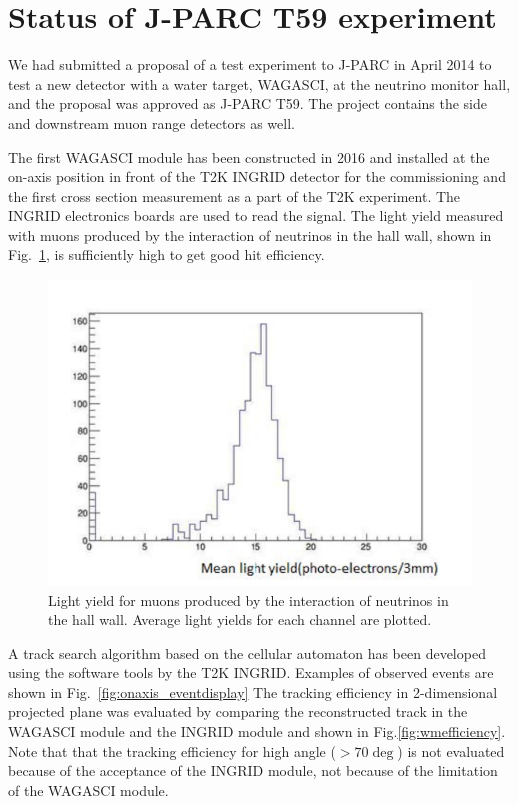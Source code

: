 \section{Status of J-PARC T59 experiment}
We had submitted a proposal of a test experiment to J-PARC in April 2014 to test a new detector with a water target, WAGASCI, at the neutrino monitor hall, and the proposal was approved as J-PARC T59.
The project contains the side and downstream muon range detectors as well.

The first WAGASCI module has been constructed in 2016 and installed at the on-axis position in front of the T2K INGRID detector for the commissioning and the first cross section measurement as a part of the T2K experiment.
The INGRID electronics boards are used to read the signal.
The light yield measured with muons produced by the interaction of neutrinos
in the hall wall, shown in Fig.~\ref{fig:wmlight}, is sufficiently high to get good hit efficiency.  
%
\begin{figure}[tbh]
\begin{center}
\includegraphics[width=0.5\linewidth]{fig/wmlight.pdf}
\end{center}
\caption{Light yield for muons produced by the interaction of neutrinos
  in the hall wall. Average light yields for each channel are plotted.
}
\label{fig:wmlight}
\end{figure}
A track search algorithm based on the cellular automaton has been developed using the software tools by the T2K INGRID. 
Examples of observed events are shown in Fig.~\ref{fig:onaxis_eventdisplay}
The tracking efficiency in 2-dimensional projected plane was evaluated by comparing the reconstructed track
in the WAGASCI module and the INGRID module and shown in Fig.\ref{fig:wmefficiency}.
Note that that the tracking efficiency for high angle ($>70\deg$) is not evaluated because of the acceptance
of the INGRID module, not because of the limitation of the WAGASCI module.
